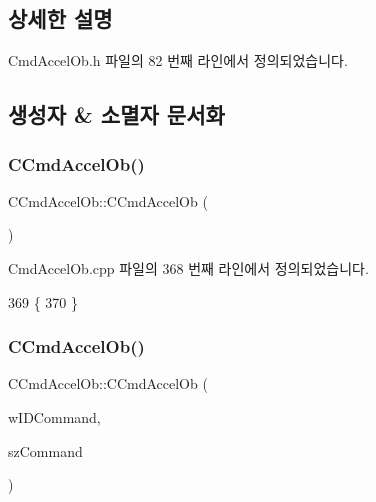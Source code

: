 \subsection{상세한 설명}


Cmd\+Accel\+Ob.\+h 파일의 82 번째 라인에서 정의되었습니다.



\subsection{생성자 \& 소멸자 문서화}
\mbox{\label{class_c_cmd_accel_ob_a2f5bb136c7ba36c31551cec05f3c47fc}} 
\subsubsection{\texorpdfstring{C\+Cmd\+Accel\+Ob()}{CCmdAccelOb()}\hspace{0.1cm}{\footnotesize\ttfamily [1/3]}}
{\footnotesize\ttfamily C\+Cmd\+Accel\+Ob\+::\+C\+Cmd\+Accel\+Ob (\begin{DoxyParamCaption}{ }\end{DoxyParamCaption})}



Cmd\+Accel\+Ob.\+cpp 파일의 368 번째 라인에서 정의되었습니다.


\begin{DoxyCode}
369 \{
370 \}
\end{DoxyCode}
\mbox{\label{class_c_cmd_accel_ob_a245369282fbad17c28924e0568fa5bcc}} 
\subsubsection{\texorpdfstring{C\+Cmd\+Accel\+Ob()}{CCmdAccelOb()}\hspace{0.1cm}{\footnotesize\ttfamily [2/3]}}
{\footnotesize\ttfamily C\+Cmd\+Accel\+Ob\+::\+C\+Cmd\+Accel\+Ob (\begin{DoxyParamCaption}\item[{W\+O\+RD}]{w\+I\+D\+Command,  }\item[{L\+P\+C\+T\+S\+TR}]{sz\+Command }\end{DoxyParamCaption})}



